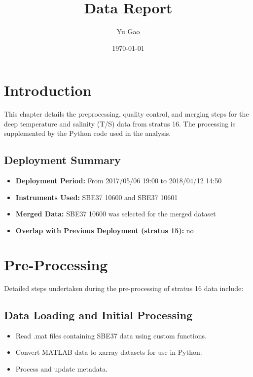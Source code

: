 \documentclass[11pt]{article}
\title{\displayprojectname{} \casenumber{} Data Report}
\author{Yu Gao}
\date{\today}
\newcommand{\projectname}{stratus}  %
\newcommand{\casenumber}{16}  %
\newcommand{\previouscasenumber}{15}  %
\newcommand{\HasNextDeploymentOverlap}{no}  %
\newcommand{\FirstInstrumentType}{SBE37}  %
\newcommand{\SecondInstrumentType}{SBE37}  %
\newcommand{\DeploymentSpike}{2017/05/06 19:00} %
\newcommand{\RecoverySpike}{2018/04/12 14:50} %
\newcommand{\FirstInstrument}{10600}
\newcommand{\SecondInstrument}{10601}
\newcommand{\CurrentDeploymentInstrument}{\FirstInstrumentType{} \FirstInstrument}  %
\begin{document}
\maketitle
\tableofcontents
\newpage


\section{Introduction}
This chapter details the preprocessing, quality control, 
and merging steps for the deep temperature and salinity (T/S) data from \projectname{} \casenumber{}.
The processing is supplemented by the Python code used in the analysis.

\subsection{Deployment Summary}
\begin{itemize}
    \item \textbf{Deployment Period:} From \DeploymentSpike{} to \RecoverySpike{}
    \item \textbf{Instruments Used:} \FirstInstrumentType{} \FirstInstrument{} and \SecondInstrumentType{} \SecondInstrument{}
    \item \textbf{Merged Data:} \CurrentDeploymentInstrument{} was selected for the merged dataset
    \item \textbf{Overlap with Previous Deployment (\projectname{} \previouscasenumber{}):} \HasNextDeploymentOverlap{}
\end{itemize}

\section{Pre-Processing}
Detailed steps undertaken during the pre-processing of \projectname{} \casenumber{} data include:

\subsection{Data Loading and Initial Processing}
\begin{itemize}
\item Read .mat files containing \FirstInstrumentType{} data using custom functions.
\item Convert MATLAB data to xarray datasets for use in Python.
\item Process and update metadata.
\end{itemize}
\end{document}
